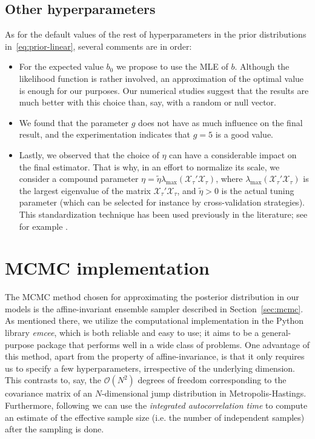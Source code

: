 \enlargethispage{1\baselineskip}

\subsection*{Other hyperparameters}

As for the default values of the rest of hyperparameters in the prior distributions in~\eqref{eq:prior-linear}, several comments are in order:
\begin{itemize}
  \item For the expected value \(b_0\) we propose to use the MLE of \(b\). Although the likelihood function is rather involved, an approximation of the optimal value is enough for our purposes. Our numerical studies suggest that the results are much better with this choice than, say, with a random or null vector.
  \item We found that the parameter \(g\) does not have as much influence on the final result, and the experimentation indicates that \(g=5\) is a good value.
  \item Lastly, we observed that the choice of \(\eta\) can have a considerable impact on the final estimator. That is why, in an effort to normalize its scale, we consider a compound parameter \(\eta = \tilde \eta \lambda_{\max}(\mathcal X_\tau'\mathcal X_\tau)\), where \(\lambda_{\max}(\mathcal X_\tau'\mathcal X_\tau)\) is the largest eigenvalue of the matrix \(\mathcal X_\tau'\mathcal X_\tau\), and \(\tilde\eta > 0\) is the actual tuning parameter (which can be selected for instance by cross-validation strategies). This standardization technique has been used previously in the literature; see for example \citet{grollemund2019bayesian}.
\end{itemize}

\section{MCMC implementation}

The MCMC method chosen for approximating the posterior distribution in our models is the affine-invariant ensemble sampler described in Section~\ref{sec:mcmc}. As mentioned there, we utilize the computational implementation in the Python library \textit{emcee}, which is both reliable and easy to use; it aims to be a general-purpose package that performs well in a wide class of problems. One advantage of this method, apart from the property of affine-invariance, is that it only requires us to specify a few hyperparameters, irrespective of the underlying dimension. This contrasts to, say, the \(\mathcal O(N^2)\) degrees of freedom corresponding to the covariance matrix of an \(N\)-dimensional jump distribution in Metropolis-Hastings.
Furthermore, following \citet{goodman2010ensemble} we can use the \textit{integrated autocorrelation time} to compute an estimate of the effective sample size (i.e. the number of independent samples) after the sampling is done.


